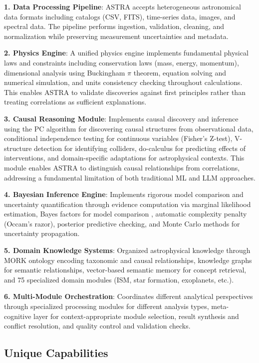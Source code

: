 \documentclass[usenatbib]{rasti}
\begin{document}
\textbf{1. Data Processing Pipeline}: ASTRA accepts heterogeneous astronomical data formats including catalogs (CSV, FITS), time-series data, images, and spectral data. The pipeline performs ingestion, validation, cleaning, and normalization while preserving measurement uncertainties and metadata.

\textbf{2. Physics Engine}: A unified physics engine implements fundamental physical laws and constraints including conservation laws (mass, energy, momentum), dimensional analysis using Buckingham $\pi$ theorem, equation solving and numerical simulation, and units consistency checking throughout calculations. This enables ASTRA to validate discoveries against first principles rather than treating correlations as sufficient explanations.

\textbf{3. Causal Reasoning Module}: Implements causal discovery and inference using the PC algorithm \cite{spirtes2000} for discovering causal structures from observational data, conditional independence testing for continuous variables (Fisher's Z-test), V-structure detection for identifying colliders, do-calculus for predicting effects of interventions, and domain-specific adaptations for astrophysical contexts. This module enables ASTRA to distinguish causal relationships from correlations, addressing a fundamental limitation of both traditional ML and LLM approaches.

\textbf{4. Bayesian Inference Engine}: Implements rigorous model comparison and uncertainty quantification through evidence computation via marginal likelihood estimation, Bayes factors for model comparison \cite{kass1995}, automatic complexity penalty (Occam's razor), posterior predictive checking, and Monte Carlo methods for uncertainty propagation.

\textbf{5. Domain Knowledge Systems}: Organized astrophysical knowledge through MORK ontology encoding taxonomic and causal relationships, knowledge graphs for semantic relationships, vector-based semantic memory for concept retrieval, and 75 specialized domain modules (ISM, star formation, exoplanets, etc.).

\textbf{6. Multi-Module Orchestration}: Coordinates different analytical perspectives through specialized processing modules for different analysis types, meta-cognitive layer for context-appropriate module selection, result synthesis and conflict resolution, and quality control and validation checks.

\subsection{Unique Capabilities}
\end{document}
